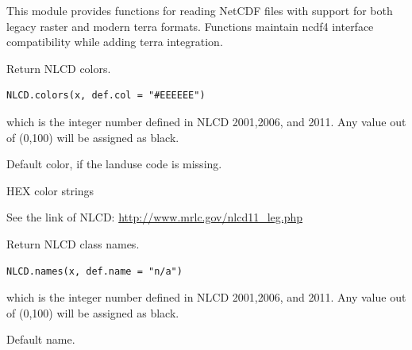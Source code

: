 \documentclass[a4paper]{book}
\begin{document}
%
\begin{Description}\relax
This module provides functions for reading NetCDF files with support for
both legacy raster and modern terra formats. Functions maintain ncdf4
interface compatibility while adding terra integration.
\end{Description}
%
\begin{Description}\relax
Return NLCD colors.
\end{Description}
%
\begin{Usage}
\begin{verbatim}
NLCD.colors(x, def.col = "#EEEEEE")
\end{verbatim}
\end{Usage}
%
\begin{Arguments}
\begin{ldescription}
\item[\code{x, }] which is the integer number defined in NLCD 2001,2006, and 2011.  Any value out of (0,100) will be assigned as black.

\item[\code{def.col}] Default color, if the landuse code is missing.
\end{ldescription}
\end{Arguments}
%
\begin{Value}
HEX color strings
\end{Value}
%
\begin{Source}\relax
See the link of NLCD: \url{http://www.mrlc.gov/nlcd11_leg.php}
\end{Source}
%
\begin{Description}\relax
Return NLCD class names.
\end{Description}
%
\begin{Usage}
\begin{verbatim}
NLCD.names(x, def.name = "n/a")
\end{verbatim}
\end{Usage}
%
\begin{Arguments}
\begin{ldescription}
\item[\code{x, }] which is the integer number defined in NLCD 2001,2006, and 2011.  Any value out of (0,100) will be assigned as black.

\item[\code{def.name}] Default name.
\end{ldescription}
\end{Arguments}
\end{document}
